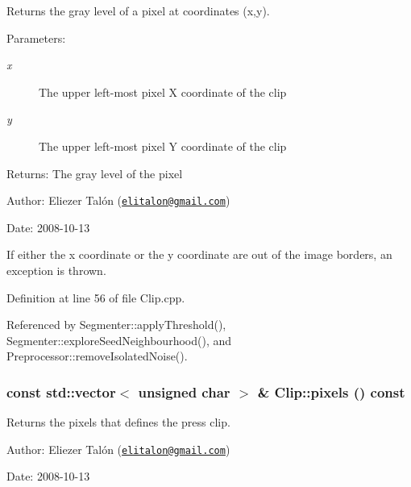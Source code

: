 Returns the gray level of a pixel at coordinates (x,y). 

\begin{Desc}
\item[Parameters:]
\begin{description}
\item[{\em x}]The upper left-most pixel X coordinate of the clip \item[{\em y}]The upper left-most pixel Y coordinate of the clip\end{description}
\end{Desc}
\begin{Desc}
\item[Returns:]The gray level of the pixel\end{Desc}
\begin{Desc}
\item[Author:]Eliezer Talón (\href{mailto:elitalon@gmail.com}{\tt elitalon@gmail.com}) \end{Desc}
\begin{Desc}
\item[Date:]2008-10-13\end{Desc}
If either the x coordinate or the y coordinate are out of the image borders, an exception is thrown. 

Definition at line 56 of file Clip.cpp.

Referenced by Segmenter::applyThreshold(), Segmenter::exploreSeedNeighbourhood(), and Preprocessor::removeIsolatedNoise().\hypertarget{class_clip_2d705268c905b41efd5caad63e4b3b4f}{
\subsubsection[pixels]{\setlength{\rightskip}{0pt plus 5cm}const std::vector$<$ unsigned char $>$ \& Clip::pixels () const}}
\label{class_clip_2d705268c905b41efd5caad63e4b3b4f}


Returns the pixels that defines the press clip. 

\begin{Desc}
\item[Author:]Eliezer Talón (\href{mailto:elitalon@gmail.com}{\tt elitalon@gmail.com}) \end{Desc}
\begin{Desc}
\item[Date:]2008-10-13 \end{Desc}


